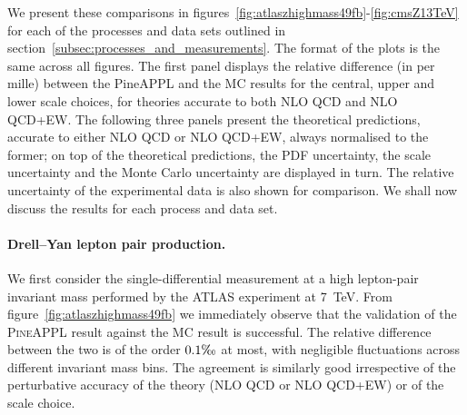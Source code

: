 We present these comparisons in
figures~\ref{fig:atlaszhighmass49fb}-\ref{fig:cmsZ13TeV} for each of the processes
and data sets outlined in section~\ref{subsec:processes_and_measurements}.
The format of the plots is the same across all figures. The first panel
displays the relative difference (in per mille) between the {\sc PineAPPL} and
the {\sc MC} results for the central, upper and lower scale choices, for
theories accurate to both NLO QCD and NLO QCD+EW. The following three panels
present the theoretical predictions, accurate to either NLO QCD or NLO QCD+EW,
always normalised to the former; on top of the theoretical predictions, the
PDF uncertainty, the scale uncertainty and the Monte Carlo uncertainty are
displayed in turn. The relative uncertainty of the experimental data is
also shown for comparison. We shall now discuss the results for each
process and data set.

\paragraph{Drell--Yan lepton pair production.} 

We first consider the single-differential measurement at a high lepton-pair
invariant mass performed by the ATLAS experiment at \SI{7}{\tera\electronvolt}.
From figure~\ref{fig:atlaszhighmass49fb} we immediately
observe that the validation of the \textsc{PineAPPL} result against the MC
result is successful. The relative difference between the two is of the order
$0.1\tcperthousand$ at most, with negligible fluctuations across different
invariant mass bins. The agreement is similarly good irrespective of the
perturbative accuracy of the theory (NLO QCD or NLO QCD+EW) or of the scale
choice.

